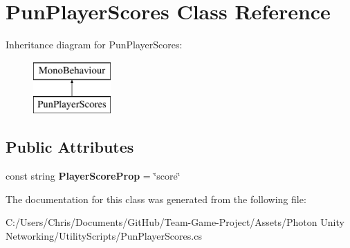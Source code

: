 \hypertarget{class_pun_player_scores}{}\section{Pun\+Player\+Scores Class Reference}
\label{class_pun_player_scores}
Inheritance diagram for Pun\+Player\+Scores\+:\begin{figure}[H]
\begin{center}
\leavevmode
\includegraphics[height=2.000000cm]{class_pun_player_scores}
\end{center}
\end{figure}
\subsection*{Public Attributes}
\begin{DoxyCompactItemize}
\item 
const string {\bfseries Player\+Score\+Prop} = \char`\"{}score\char`\"{}\hypertarget{class_pun_player_scores_a654bdaef3545c4463442239792198265}{}\label{class_pun_player_scores_a654bdaef3545c4463442239792198265}

\end{DoxyCompactItemize}


The documentation for this class was generated from the following file\+:\begin{DoxyCompactItemize}
\item 
C\+:/\+Users/\+Chris/\+Documents/\+Git\+Hub/\+Team-\/\+Game-\/\+Project/\+Assets/\+Photon Unity Networking/\+Utility\+Scripts/Pun\+Player\+Scores.\+cs\end{DoxyCompactItemize}
